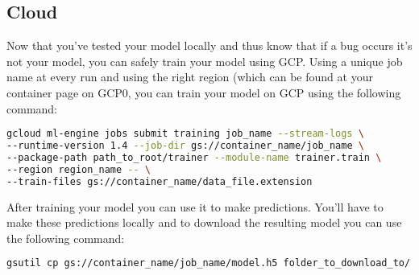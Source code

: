 \documentclass{article}
\begin{document}
\subsection{Cloud}
Now that you've tested your model locally and thus know that if a bug occurs it's not your model, you can safely train your model using GCP. Using a unique job name at every run and using the right region (which can be found at your container page on GCP0, you can train your model on GCP using the following command:
\begin{lstlisting}[language=Bash]
gcloud ml-engine jobs submit training job_name --stream-logs \
--runtime-version 1.4 --job-dir gs://container_name/job_name \
--package-path path_to_root/trainer --module-name trainer.train \
--region region_name -- \
--train-files gs://container_name/data_file.extension
\end{lstlisting}
After training your model you can use it to make predictions. You'll have to make these predictions locally and to download the resulting model you can use the following command:
\begin{lstlisting}[language=Bash]
gsutil cp gs://container_name/job_name/model.h5 folder_to_download_to/
\end{lstlisting}
\end{document}
